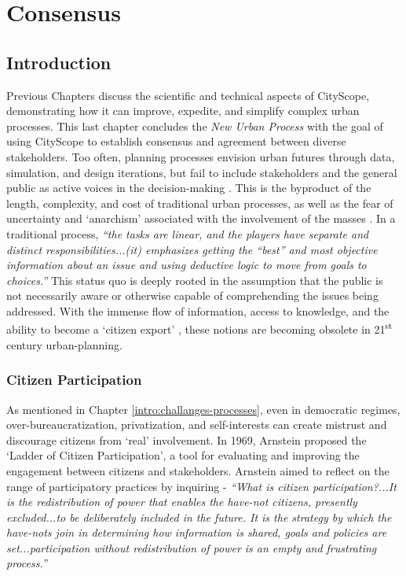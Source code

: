 \chapter{Consensus}\label{ch:consensus}
{
    \section{Introduction}
     {
      Previous Chapters discuss the scientific and technical aspects of CityScope, demonstrating how it can improve, expedite, and simplify complex urban processes. This last chapter concludes the \textit{New Urban Process} with the goal of using CityScope to establish consensus and agreement between diverse stakeholders. Too often, planning processes envision urban futures through data, simulation, and design iterations, but fail to include stakeholders and the general public as active voices in the decision-making \cite{Innes2016}. This is the byproduct of the length, complexity, and cost of traditional urban processes, as well as the fear of uncertainty and `anarchism' associated with the involvement of the masses \cite{banerjee2011companion}. In a traditional process, \textit{``the tasks are linear, and the players have separate and distinct responsibilities...(it) emphasizes getting the ``best'' and most objective information about an issue and using deductive logic to move from goals to choices.''} \cite{Innes2016} This status quo is deeply rooted in the assumption that the public is not necessarily aware or otherwise capable of comprehending the issues being addressed. With the immense flow of information, access to knowledge, and the ability to become a `citizen export' \cite{banerjee2011companion}, these notions are becoming obsolete in 21\textsuperscript{st} century urban-planning.


      \subsection{Citizen Participation}
      {
          As mentioned in Chapter \eqref{intro:challanges-processes}, even in democratic regimes, over-bureaucratization, privatization, and self-interests can create mistrust and discourage citizens from `real' involvement. In 1969, Arnstein proposed the `Ladder of Citizen Participation', a tool for evaluating and improving the engagement between citizens and stakeholders. Arnstein aimed to reflect on the range of participatory practices by inquiring - \textit{``What is citizen participation?...It is the redistribution of power that enables the have-not citizens, presently excluded...to be deliberately included in the future. It is the strategy by which the have-nots join in determining how information is shared, goals and policies are set...participation without redistribution of power is an empty and frustrating process.''} \cite{arnstein1969ladder}
      }

}}
